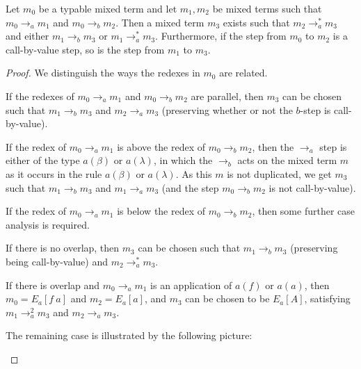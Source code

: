 \documentclass{LMCS}
\newcommand{\To}[0]{\Rightarrow}
\begin{document}
\begin{lem}
\label{lem:beta}
Let $m_0$ be a typable mixed term and let $m_1,m_2$ be mixed terms
such that $m_0 \to_a m_1$ and $m_0 \to_b m_2$. Then a mixed term $
m_3$ exists such that $m_2 \to_a^* m_3$ and 
either $m_1 \to_b m_3$ or $m_1 \to_a^* m_3$. Furthermore, if the step
from $m_0$ to $m_2$ is a call-by-value step, so is the step from $m_1$
to $m_3$.
\end{lem}

\begin{proof}
We distinguish the ways the redexes in $m_0$ are related.

If the redexes of $m_0 \to_a m_1$ and $m_0 \to_b m_2$ are parallel,
then $m_3$ can be chosen such that $m_1 \to_b m_3$ and $m_2 \to_a m_3$
(preserving whether or not the $b$-step is call-by-value).

If the redex of $m_0 \to_a m_1$ is above the redex of $m_0 \to_b
m_2$,
then the $\to_a$ step is either of the type $a(\beta)$ or
$a(\lambda)$, in which the $\to_b$ acts on the mixed term $m$ as it
occurs in the rule $a(\beta)$ or $a(\lambda)$. As this $m$ is not
duplicated, we get $m_3$ such that $m_1 \to_b m_3$ and
$m_1 \to_a m_3$ (and the step $m_0\to_b m_2$ is not call-by-value).

If the redex of $m_0 \to_a m_1$ is below the redex of $m_0 \to_b
m_2$, then some further case analysis is required.

If there is no overlap, then $m_3$ can be chosen such that 
$m_1 \to_b m_3$ (preserving being call-by-value) and $m_2 \to_a^* m_3$. 

If there is overlap and $m_0 \to_a m_1$ is an application of
$a(f)$ or $a(a)$, then $m_0 = E_a[f\ a]$ and $m_2 = E_a[a]$, and
$m_3$ can be chosen to be $E_a[A]$, satisfying
$m_1 \to_a^2 m_3$ and $m_2 \to_a m_3$.

The remaining case is illustrated by the following picture:

\begin{center}
\end{center}
\end{proof}
\end{document}
